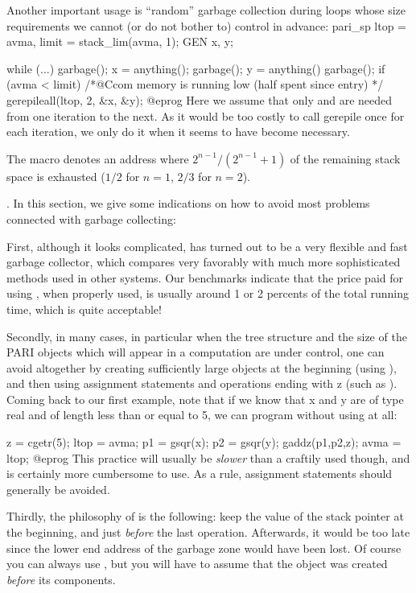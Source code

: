 Another important usage is ``random'' garbage collection during loops
whose size requirements we cannot (or do not bother to) control in advance:
\bprog
  pari_sp ltop = avma, limit = stack_lim(avma, 1);
  GEN x, y;

  while (...)
  {
    garbage(); x = anything();
    garbage(); y = anything()
    garbage();
    if (avma < limit) /*@Ccom memory is running low (half spent since entry) */
      gerepileall(ltop, 2, &x, &y);
  } 
@eprog
\noindent Here we assume that only  and  are needed from one
iteration to the next. As it would be too costly to call gerepile once for
each iteration, we only do it when it seems to have become necessary.

The macro  denotes an address where $2^{n-1} /
(2^{n-1}+1)$ of the remaining stack space is exhausted ($1/2$ for $n=1$,
$2/3$ for $n=2$).

. In this section, we give some indications
on how to avoid most problems connected with garbage collecting:

First, although it looks complicated,  has turned out to be a
very flexible and fast garbage collector, which compares very favorably
with much more sophisticated methods used in other systems. Our benchmarks
indicate that the price paid for using , when properly used, is
usually around 1 or 2 percents of the total running time, which is quite
acceptable!

Secondly, in many cases, in particular when the tree structure and the size of
the PARI objects which will appear in a computation are under control, one
can avoid  altogether by creating sufficiently large objects at
the beginning (using ), and then using assignment statements and
operations ending with z (such as ). Coming back to our first
example, note that if we know that x and y are of type real and of length
less than or equal to 5, we can program without using  at all:

\bprog
  z = cgetr(5); ltop = avma;
  p1 = gsqr(x); p2 = gsqr(y); gaddz(p1,p2,z);
  avma = ltop;
@eprog
\noindent This practice will usually be \emph{slower} than a craftily used
 though, and is certainly more cumbersome to use. As a rule,
assignment statements should generally be avoided.
\smallskip

Thirdly, the philosophy of  is the following: keep the value of
the stack pointer  at the beginning, and just \emph{before} the
last operation.  Afterwards, it would be too late since the lower end address
of the garbage zone would have been lost. Of course you can always use
, but you will have to assume that the object was created
\emph{before} its components.


